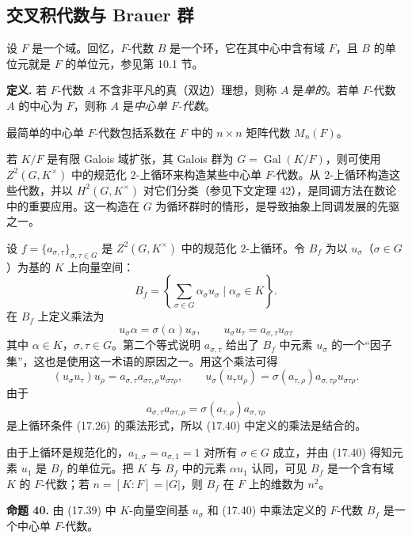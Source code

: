 \subsection*{交叉积代数与 Brauer 群}

设 $F$ 是一个域。回忆，$F$-代数 $B$ 是一个环，它在其中心中含有域 $F$，且 $B$ 的单位元就是 $F$ 的单位元，参见第 10.1 节。

\noindent\textbf{定义.} 若 $F$-代数 $A$ 不含非平凡的真（双边）理想，则称 $A$ 是\emph{单的}。若单 $F$-代数 $A$ 的中心为 $F$，则称 $A$ 是\emph{中心单 $F$-代数}。

最简单的中心单 $F$-代数包括系数在 $F$ 中的 $n\times n$ 矩阵代数 $M_n(F)$。

若 $K/F$ 是有限 Galois 域扩张，其 Galois 群为 $G=\operatorname{Gal}(K/F)$，则可使用 $Z^2(G,K^\times)$ 中的规范化 $2$-上循环来构造某些中心单 $F$-代数。从 $2$-上循环构造这些代数，并以 $H^2(G,K^\times)$ 对它们分类（参见下文定理 42），是同调方法在数论中的重要应用。这一构造在 $G$ 为循环群时的情形，是导致抽象上同调发展的先驱之一。

设 $f=\{a_{\sigma,\tau}\}_{\sigma,\tau\in G}$ 是 $Z^2(G,K^\times)$ 中的规范化 $2$-上循环。令 $B_f$ 为以 $u_\sigma$（$\sigma\in G$）为基的 $K$ 上向量空间：
\[
  B_f=\left\{\sum_{\sigma\in G}\alpha_\sigma u_\sigma\mid \alpha_\sigma\in K\right\}.
  \tag{17.39}
\]
在 $B_f$ 上定义乘法为
\[
  u_\sigma\alpha=\sigma(\alpha)u_\sigma,
  \qquad
  u_\sigma u_\tau=a_{\sigma,\tau}u_{\sigma\tau}
  \tag{17.40}
\]
其中 $\alpha\in K$，$\sigma,\tau\in G$。第二个等式说明 $a_{\sigma,\tau}$ 给出了 $B_f$ 中元素 $u_\sigma$ 的一个“因子集”，这也是使用这一术语的原因之一。用这个乘法可得
\[
  (u_\sigma u_\tau)u_\rho=a_{\sigma,\tau}a_{\sigma\tau,\rho}u_{\sigma\tau\rho},
  \qquad
  u_\sigma(u_\tau u_\rho)=\sigma(a_{\tau,\rho})a_{\sigma,\tau\rho}u_{\sigma\tau\rho}.
\]
由于
\[
  a_{\sigma,\tau}a_{\sigma\tau,\rho}=\sigma(a_{\tau,\rho})a_{\sigma,\tau\rho}
\]
是上循环条件 (17.26) 的乘法形式，所以 (17.40) 中定义的乘法是结合的。

由于上循环是规范化的，$a_{1,\sigma}=a_{\sigma,1}=1$ 对所有 $\sigma\in G$ 成立，并由 (17.40) 得知元素 $u_1$ 是 $B_f$ 的单位元。把 $K$ 与 $B_f$ 中的元素 $\alpha u_1$ 认同，可见 $B_f$ 是一个含有域 $K$ 的 $F$-代数；若 $n=[K:F]=|G|$，则 $B_f$ 在 $F$ 上的维数为 $n^2$。

\medskip
\noindent\textbf{命题 40.} 由 (17.39) 中 $K$-向量空间基 $u_\sigma$ 和 (17.40) 中乘法定义的 $F$-代数 $B_f$ 是一个中心单 $F$-代数。

